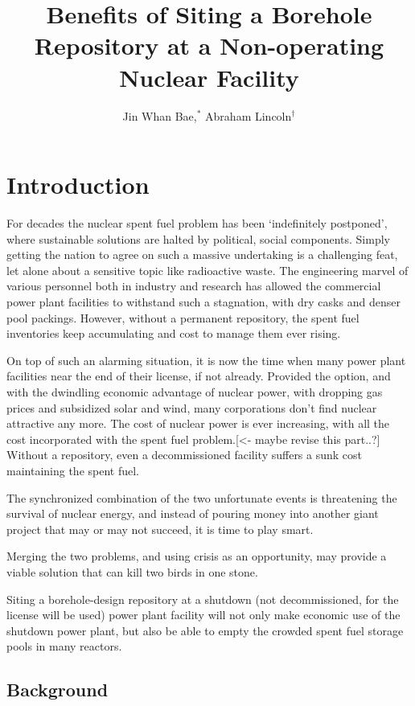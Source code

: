 \documentclass{anstrans}
\title{Benefits of Siting a Borehole Repository at a Non-operating Nuclear 
Facility}
\author{Jin Whan Bae,$^{*}$ Abraham Lincoln$^{\dagger}$}
\institute{
$^{*}$Dept. of Nuclear Plasma, and Radiological Engineering, University of Illinois at Urbana-Champaign, Urbana, IL
\and
$^{\dagger}$State Capitol Building, Springfield, IL
}
\begin{document}
\section{Introduction}

For decades the nuclear spent fuel problem has been `indefinitely postponed', 
where sustainable solutions are halted by political, social components. Simply 
getting the nation to agree on such a massive undertaking is a challenging feat, let 
alone about a sensitive topic like radioactive waste. The engineering marvel of 
various personnel both in industry and research has allowed the commercial 
power plant facilities to withstand such a stagnation, with dry casks and 
denser pool packings. However, without a permanent repository, the spent fuel 
inventories keep accumulating and cost to manage them ever rising.

On top of such an alarming situation, it is now the time when many power plant 
facilities near the end of their license, if not already. Provided the option, 
and with the dwindling economic advantage of nuclear power, with dropping gas 
prices and subsidized solar and wind, many corporations don't find nuclear 
attractive any more. The cost of nuclear power is ever increasing, with all the 
cost incorporated with the spent fuel problem.[<- maybe revise this part..?]  Without a repository, even a 
decommissioned facility suffers a sunk cost maintaining the spent fuel.

The synchronized combination of the two unfortunate events is threatening the 
survival of nuclear energy, and instead of pouring money into another giant 
project that may or may not succeed, it is time to play smart.

Merging the two problems, and using crisis as an opportunity, may provide a 
viable solution that can kill two birds in one stone.

Siting a borehole-design repository at a shutdown (not decommissioned, for the 
license will be used) power plant facility will not only make economic use of 
the shutdown power plant, but also be able to empty the crowded spent fuel 
storage pools in many reactors.


\subsection{Background}
\end{document}
